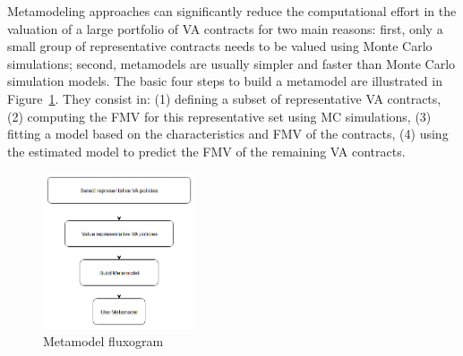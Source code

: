 Metamodeling approaches can significantly reduce the computational effort in the valuation of a large portfolio of VA contracts for two main reasons: first, only a small group of representative contracts needs to be valued using Monte Carlo simulations; second, metamodels are usually simpler and faster than Monte Carlo simulation models. The basic four steps to build a metamodel are illustrated in Figure~\ref{metamodeling}. They consist in: (1) defining a subset of representative VA contracts, (2) computing the FMV for this representative set using MC simulations, (3) fitting a model based on the characteristics and FMV of the contracts, (4) using the estimated model to predict the FMV of the remaining VA contracts. 

\begin{figure}[ht]
\begin{center}
  	\includegraphics[width=0.4\textwidth]{pictures/novais3.png}
    \caption{Metamodel fluxogram}\label{metamodeling}
\end{center}
\end{figure}



